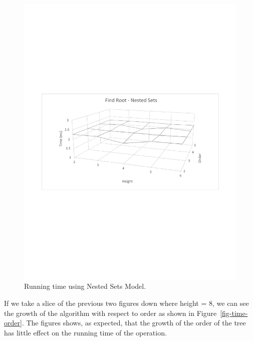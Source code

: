 \begin{figure}[!h]
\begin{center}
\includegraphics[width=6in]{images/root-ns-wire.pdf}
\caption{Running time using Nested Sets Model.\label{fig-root-ns}}
\end{center}
\end{figure}

If we take a slice of the previous two figures down where height = 8, we can see the growth of the algorithm with respect to order as shown in Figure~\ref{fig-time-order}. The figures shows, as expected, that the growth of the order of the tree has little effect on the running time of the operation.

